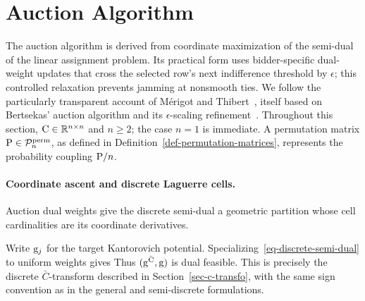\section{Auction Algorithm}
\label{sec-auction-dual-ascent}

The auction algorithm is derived from coordinate maximization of the semi-dual of the linear assignment problem. Its practical form uses bidder-specific dual-weight updates that cross the selected row's next indifference threshold by $\epsilon$; this controlled relaxation prevents jamming at nonsmooth ties. We follow the particularly transparent account of M\'erigot and Thibert~\cite[Sec.~3.2]{merigot2020optimaltransportalgorithms}, itself based on Bertsekas' auction algorithm and its $\epsilon$-scaling refinement~\cite{bertsekas1981new,bertsekas1988dual,bertsekas1992auction}. Throughout this section, $\C\in\RR^{n\times n}$ and $n\geq2$; the case $n=1$ is immediate. A permutation matrix $\P\in\mathcal P_n^{\mathrm{perm}}$, as defined in Definition~\ref{def-permutation-matrices}, represents the probability coupling $\P/n$.

\paragraph{Coordinate ascent and discrete Laguerre cells.}
Auction dual weights give the discrete semi-dual a geometric partition whose cell cardinalities are its coordinate derivatives.

Write $\gD_j$ for the target Kantorovich potential. Specializing~\eqref{eq-discrete-semi-dual} to uniform weights gives
Thus $(\gD^{\bar\C},\gD)$ is dual feasible. This is precisely the discrete $\bar C$-transform described in Section~\ref{sec-c-transfo}, with the same sign convention as in the general and semi-discrete formulations.

